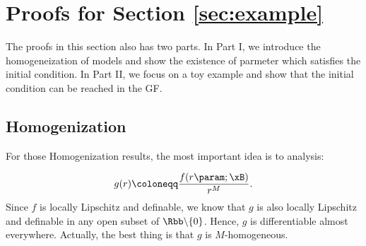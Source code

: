 \section{Proofs for Section \ref{sec:example}}  
\label{sec:proof-eg}

The proofs in this section also has two parts. In Part I, we introduce the homogeneization of models and show the existence of parmeter which satisfies the initial condition. In Part II, we focus on a toy example and show that the initial condition can be reached in the GF. 

\subsection{Homogenization} \label{sec:homogenization}

For those Homogenization results, the most important idea is to analysis: 

\begin{equation*}
g(r) \coloneqq \frac{f(r \param; \xB)}{r^M}.
\end{equation*}
Since $f$ is locally Lipschitz and definable, we know that $g$ is also locally Lipschitz and definable in any open subset of $\Rbb \backslash \{ 0 \}$. Hence, $g$ is differentiable almost everywhere. Actually, the best thing is that $g$ is $M$-homogeneous. 

